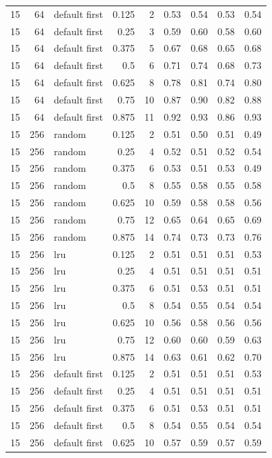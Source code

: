 \begin{longtable}{@{}rrlrrrrrr@{}}
15 & 64 & default first & 0.125 & 2 & 0.53 & 0.54 & 0.53 & 0.54 \\
15 & 64 & default first & 0.25 & 3 & 0.59 & 0.60 & 0.58 & 0.60 \\
15 & 64 & default first & 0.375 & 5 & 0.67 & 0.68 & 0.65 & 0.68 \\
15 & 64 & default first & 0.5 & 6 & 0.71 & 0.74 & 0.68 & 0.73 \\
15 & 64 & default first & 0.625 & 8 & 0.78 & 0.81 & 0.74 & 0.80 \\
15 & 64 & default first & 0.75 & 10 & 0.87 & 0.90 & 0.82 & 0.88 \\
15 & 64 & default first & 0.875 & 11 & 0.92 & 0.93 & 0.86 & 0.93 \\
15 & 256 & random & 0.125 & 2 & 0.51 & 0.50 & 0.51 & 0.49 \\
15 & 256 & random & 0.25 & 4 & 0.52 & 0.51 & 0.52 & 0.54 \\
15 & 256 & random & 0.375 & 6 & 0.53 & 0.51 & 0.53 & 0.49 \\
15 & 256 & random & 0.5 & 8 & 0.55 & 0.58 & 0.55 & 0.58 \\
15 & 256 & random & 0.625 & 10 & 0.59 & 0.58 & 0.58 & 0.56 \\
15 & 256 & random & 0.75 & 12 & 0.65 & 0.64 & 0.65 & 0.69 \\
15 & 256 & random & 0.875 & 14 & 0.74 & 0.73 & 0.73 & 0.76 \\
15 & 256 & lru & 0.125 & 2 & 0.51 & 0.51 & 0.51 & 0.53 \\
15 & 256 & lru & 0.25 & 4 & 0.51 & 0.51 & 0.51 & 0.51 \\
15 & 256 & lru & 0.375 & 6 & 0.51 & 0.53 & 0.51 & 0.51 \\
15 & 256 & lru & 0.5 & 8 & 0.54 & 0.55 & 0.54 & 0.54 \\
15 & 256 & lru & 0.625 & 10 & 0.56 & 0.58 & 0.56 & 0.56 \\
15 & 256 & lru & 0.75 & 12 & 0.60 & 0.60 & 0.59 & 0.63 \\
15 & 256 & lru & 0.875 & 14 & 0.63 & 0.61 & 0.62 & 0.70 \\
15 & 256 & default first & 0.125 & 2 & 0.51 & 0.51 & 0.51 & 0.53 \\
15 & 256 & default first & 0.25 & 4 & 0.51 & 0.51 & 0.51 & 0.51 \\
15 & 256 & default first & 0.375 & 6 & 0.51 & 0.53 & 0.51 & 0.51 \\
15 & 256 & default first & 0.5 & 8 & 0.54 & 0.55 & 0.54 & 0.54 \\
15 & 256 & default first & 0.625 & 10 & 0.57 & 0.59 & 0.57 & 0.59 \\

\end{longtable}
